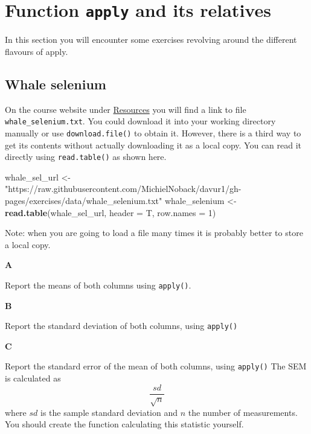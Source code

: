 \documentclass[]{book}
\newenvironment{Shaded}{\begin{snugshade}}{\end{snugshade}}
\newcommand{\DataTypeTok}[1]{\textcolor[rgb]{0.13,0.29,0.53}{#1}}
\newcommand{\DecValTok}[1]{\textcolor[rgb]{0.00,0.00,0.81}{#1}}
\newcommand{\KeywordTok}[1]{\textcolor[rgb]{0.13,0.29,0.53}{\textbf{#1}}}
\newcommand{\NormalTok}[1]{#1}
\newcommand{\StringTok}[1]{\textcolor[rgb]{0.31,0.60,0.02}{#1}}
\begin{document}
\hypertarget{function-apply-and-its-relatives}{%
\section{\texorpdfstring{Function \texttt{apply} and its relatives}{Function apply and its relatives}}\label{function-apply-and-its-relatives}}

In this section you will encounter some exercises revolving around the different flavours of apply.

\hypertarget{whale-selenium}{%
\subsection{Whale selenium}\label{whale-selenium}}

On the course website under \href{https://michielnoback.github.io/bincourses/course_contents/davur/resources.html}{Resources} you will find a link to file \texttt{whale\_selenium.txt}. You could download it into your working directory manually or use \texttt{download.file()} to obtain it. However, there is a third way to get its contents without actually downloading it as a local copy. You can read it directly using \texttt{read.table()} as shown here.

\begin{Shaded}
\begin{Highlighting}[]
\NormalTok{whale_sel_url <-}\StringTok{ "https://raw.githubusercontent.com/MichielNoback/davur1/gh-pages/exercises/data/whale_selenium.txt"}
\NormalTok{whale_selenium <-}\StringTok{ }\KeywordTok{read.table}\NormalTok{(whale_sel_url,}
    \DataTypeTok{header =}\NormalTok{ T,}
    \DataTypeTok{row.names =} \DecValTok{1}\NormalTok{)}
\end{Highlighting}
\end{Shaded}

Note: when you are going to load a file many times it is probably better to store a local copy.

\textbf{A}

Report the means of both columns using \texttt{apply()}.

\textbf{B}

Report the standard deviation of both columns, using \texttt{apply()}

\textbf{C}

Report the standard error of the mean of both columns, using \texttt{apply()} The SEM is calculated as \[\frac{sd}{\sqrt{n}}\] where \(sd\) is the sample standard deviation and \(n\) the number of measurements. You should create the function calculating this statistic yourself.
\end{document}
